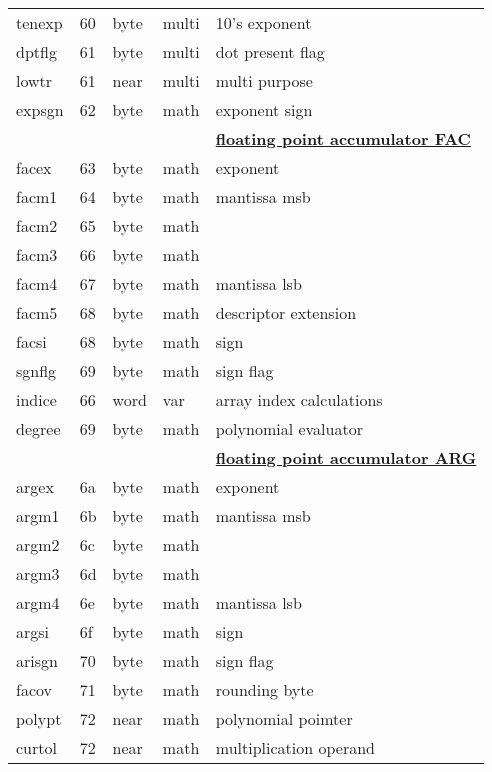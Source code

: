 {\begin{tabular}{|l|l|l|l|l|}
tenexp           &   60 & byte   & multi  & 10's exponent \\
dptflg           &   61 & byte   & multi  & dot present flag \\
lowtr            &   61 & near   & multi  & multi purpose \\
expsgn           &   62 & byte   & math   & exponent sign \\
 & & & &  {\underline {\bf floating point accumulator FAC}} \\
facex            &   63 & byte   & math   & exponent \\
facm1            &   64 & byte   & math   & mantissa msb \\
facm2            &   65 & byte   & math   &  \\
facm3            &   66 & byte   & math   &  \\
facm4            &   67 & byte   & math   & mantissa lsb \\
facm5            &   68 & byte   & math   & descriptor extension \\
facsi            &   68 & byte   & math   & sign \\
sgnflg           &   69 & byte   & math   & sign flag \\
indice           &   66 & word   & var    & array index calculations \\
degree           &   69 & byte   & math   & polynomial evaluator \\
 & & & &  {\underline {\bf floating point accumulator ARG}} \\
argex            &   6a & byte   & math   & exponent \\
argm1            &   6b & byte   & math   & mantissa msb \\
argm2            &   6c & byte   & math   &  \\
argm3            &   6d & byte   & math   &  \\
argm4            &   6e & byte   & math   & mantissa lsb \\
argsi            &   6f & byte   & math   & sign \\
arisgn           &   70 & byte   & math   & sign flag \\
facov            &   71 & byte   & math   & rounding byte \\
polypt           &   72 & near   & math   & polynomial poimter \\
curtol           &   72 & near   & math   & multiplication operand \\
\hline
\end{tabular}
}
\newpage
